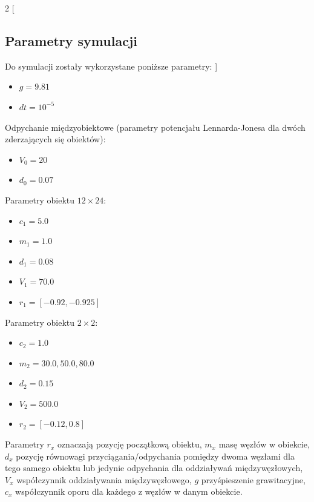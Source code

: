 \documentclass[12pt, letterpaper]{report}
\begin{document}
    \begin{multicols}{2}
        [
            \subsection{Parametry symulacji}
            Do symulacji zostały wykorzystane poniższe parametry:
        ]

        \begin{itemize}
            \item $g = 9.81$
            \item $dt = 10^{-5}$
        \end{itemize}
        Odpychanie międzyobiektowe (parametry potencjału Lennarda-Jonesa dla dwóch zderzających się obiektów):
        \begin{itemize}
            \item $V_{0} = 20$
            \item $d_{0} = 0.07$
        \end{itemize}
        Parametry obiektu $12 \times 24$:
        \begin{itemize}
            \item $c_{1} = 5.0$
            \item $m_{1} = 1.0$
            \item $d_{1} = 0.08$
            \item $V_{1} = 70.0$
            \item $r_{1} = [-0.92, -0.925]$
        \end{itemize}
        Parametry obiektu $2 \times 2$:
        \begin{itemize}
            \item $c_{2} = 1.0$
            \item $m_{2} = 30.0, 50.0, 80.0$
            \item $d_{2} = 0.15$
            \item $V_{2} = 500.0$
            \item $r_{2} = [-0.12, 0.8]$
        \end{itemize}
    \end{multicols}

    Parametry $r_x$ oznaczają pozycję początkową obiektu, $m_x$ masę węzłów w obiekcie, 
    $d_x$ pozycję równowagi przyciągania/odpychania pomiędzy dwoma węzłami dla tego
    samego obiektu lub jedynie odpychania dla oddziaływań międzywęzłowych,
    $V_x$ współczynnik oddziaływania międzywęzłowego, $g$ przyśpieszenie grawitacyjne, 
    $c_x$ współczynnik oporu dla każdego z węzłów w danym obiekcie.
\end{document}
